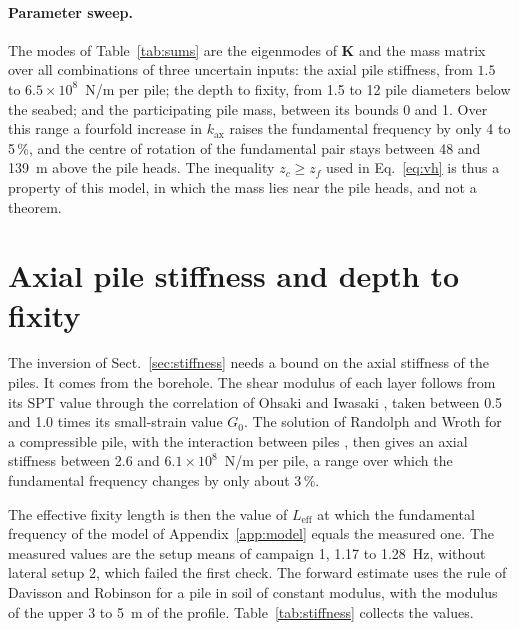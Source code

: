 \documentclass[11pt]{article}
\begin{document}
\paragraph{Parameter sweep.} The modes of Table~\ref{tab:sums} are the eigenmodes of $\mathbf{K}$ and the mass matrix over all combinations of three uncertain inputs: the axial pile stiffness, from $1.5$ to $6.5\times10^{8}$~N/m per pile; the depth to fixity, from 1.5 to 12 pile diameters below the seabed; and the participating pile mass, between its bounds 0 and 1. Over this range a fourfold increase in $k_{\mathrm{ax}}$ raises the fundamental frequency by only 4 to 5\,\%, and the centre of rotation of the fundamental pair stays between 48 and 139~m above the pile heads. The inequality $z_c \geq z_f$ used in Eq.~\eqref{eq:vh} is thus a property of this model, in which the mass lies near the pile heads, and not a theorem.

\section{Axial pile stiffness and depth to fixity}
\label{app:fixity}

The inversion of Sect.~\ref{sec:stiffness} needs a bound on the axial stiffness of the piles. It comes from the borehole. The shear modulus of each layer follows from its SPT value through the correlation of Ohsaki and Iwasaki \cite{ohsaki1973}, taken between 0.5 and 1.0 times its small-strain value $G_0$. The solution of Randolph and Wroth \cite{randolph1978} for a compressible pile, with the interaction between piles \cite{randolph1979}, then gives an axial stiffness between 2.6 and $6.1\times10^{8}$~N/m per pile, a range over which the fundamental frequency changes by only about 3\,\%.

The effective fixity length is then the value of $L_{\mathrm{eff}}$ at which the fundamental frequency of the model of Appendix~\ref{app:model} equals the measured one. The measured values are the setup means of campaign 1, 1.17 to 1.28~Hz, without lateral setup 2, which failed the first check. The forward estimate uses the rule of Davisson and Robinson \cite{davisson1965} for a pile in soil of constant modulus, with the modulus of the upper 3 to 5~m of the profile. Table~\ref{tab:stiffness} collects the values.
\end{document}
